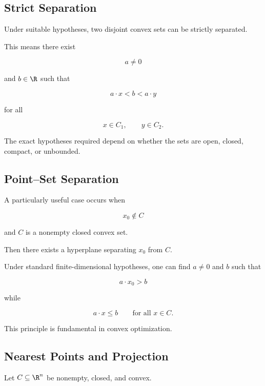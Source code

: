 \subsection{Strict Separation}
\label{subsec:strict-separation}

Under suitable hypotheses, two disjoint convex sets can be strictly
separated.

This means there exist

\[
a\neq0
\]

and \(b\in\R\) such that

\[
\boxed{
a\cdot x<b<a\cdot y
}
\]

for all

\[
x\in C_1,
\qquad
y\in C_2.
\]

The exact hypotheses required depend on whether the sets are open, closed,
compact, or unbounded.

\subsection{Point--Set Separation}
\label{subsec:point-set-separation}

A particularly useful case occurs when

\[
x_0\notin C
\]

and \(C\) is a nonempty closed convex set.

Then there exists a hyperplane separating \(x_0\) from \(C\).

Under standard finite-dimensional hypotheses, one can find \(a\neq0\) and
\(b\) such that

\[
\boxed{
a\cdot x_0>b
}
\]

while

\[
\boxed{
a\cdot x\leq b
\qquad
\text{for all }x\in C.
}
\]

This principle is fundamental in convex optimization.

\subsection{Nearest Points and Projection}
\label{subsec:convex-projection}

Let \(C\subseteq\R^n\) be nonempty, closed, and convex.


